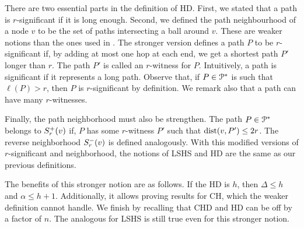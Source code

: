 There are two essential parts in the definition of HD.
First, we stated that a path is $r$-significant if it is long enough.
Second, we defined the path neighbourhood of a node $v$ to be the set of paths intersecting a ball around $v$.
These are weaker notions than the ones used in \cite{highway2013}. 
The stronger version defines a path $P$ to be $r$-significant if, by adding at most one hop at each end, we get a shortest path $P'$ longer than $r$.
The path $P'$ is called an $r$-witness for $P$.
Intuitively, a path is significant if it represents a long path.
Observe that, if $P\in\mathcal{P}^*$ is such that $\ell(P)>r$, then $P$ is $r$-significant by definition.
We remark also that a path can have many $r$-witnesses.

Finally, the path neighborhood must also be strengthen.
The path $P\in\mathcal{P}^*$ belongs to $S^+_r(v)$ if, $P$ has some $r$-witness $P'$ such that $\mbox{dist}(v,P')\leq 2r$.
The reverse neighborhood $S^-_r(v)$ is defined analogously.
With this modified versions of $r$-significant and neighborhood, the notions of LSHS and HD are the same as our previous definitions.

The benefits of this stronger notion are as follows.
If the HD is $h$, then $\Delta\leq h$ and $\alpha\leq h+1$.
Additionally, it allows proving results for CH, which the weaker definition cannot handle.
We finish by recalling that CHD and HD can be off by a factor of $n$.
The analogous for LSHS is still true even for this stronger notion.

